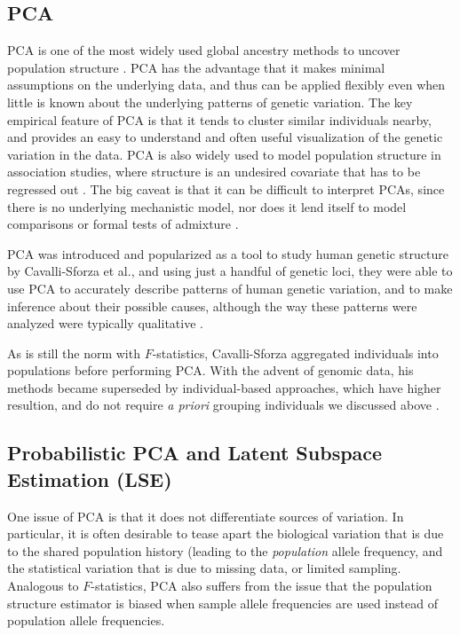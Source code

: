 \documentclass[12pt, letterpaper]{article}
\begin{document}
\subsection{PCA}
PCA is one of the most widely used global ancestry methods to uncover population structure \cite{cavalli-sforza_analysis_1975, mcvean_genealogical_2009, engelhardt_analysis_2010}. PCA has the advantage that it makes minimal assumptions on the underlying data, and thus can be applied flexibly even when little is known about the underlying patterns of genetic variation. The key empirical feature of PCA is that it tends to cluster similar individuals nearby, and provides an easy to understand and often useful visualization of the genetic variation in the data. PCA is also widely used to model population structure in association studies, where structure is an undesired covariate that has to be regressed out \cite{price_principal_2006}. The big caveat is that it can be difficult to interpret PCAs, since there is no underlying mechanistic model, nor does it lend itself to model comparisons or formal tests of admixture \cite{mcvean_genealogical_2009, novembre_interpreting_2008}.


PCA was introduced and popularized as a tool to study human genetic structure by Cavalli-Sforza et al., and using just a handful of genetic loci, they were able to use PCA to accurately describe patterns of human genetic variation, and to make inference about their possible causes, although the way these patterns were analyzed were typically qualitative \cite{menozzi_synthetic_1978, sforza_great_1995, l_l_cavalli-sforza_history_1996}.

As is still the norm with $F$-statistics, Cavalli-Sforza aggregated individuals into populations before performing PCA. With the advent of genomic data, his methods became superseded by individual-based approaches, which have higher resultion, and do not require \textit{a priori} grouping individuals we discussed above \cite{patterson_population_2006, novembre_genes_2008, price_principal_2006}.

\subsection{Probabilistic PCA and Latent Subspace Estimation (LSE)}
One issue of PCA is that it does not differentiate sources of variation. In particular, it is often desirable to tease apart the biological variation that is due to the shared population history (leading to the \textit{population} allele frequency, and the statistical variation that is due to missing data, or limited sampling. Analogous to $F$-statistics, PCA also suffers from the issue that the population structure estimator is biased when sample allele frequencies are used instead of population allele frequencies. 
\end{document}
